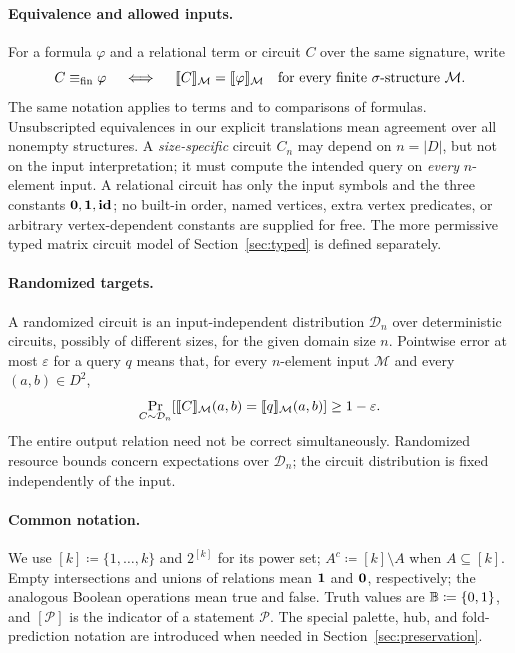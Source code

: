 \paragraph{Equivalence and allowed inputs.}
For a formula $\varphi$ and a relational term or circuit $C$ over
the same signature, write
\[
 C\equiv_{\mathrm{fin}}\varphi
 \quad\iff\quad
 \llbracket C\rrbracket_{\mathcal M}=\llbracket \varphi\rrbracket_{\mathcal M}
 \quad\text{for every finite $\sigma$-structure $\mathcal M$.}
\]
The same notation applies to terms and to comparisons of formulas.
Unsubscripted equivalences in our explicit translations mean
agreement over all nonempty structures. A \emph{size-specific} circuit
$C_n$ may depend on $n=|D|$, but not on the input interpretation;
it must compute the intended query on \emph{every} $n$-element
input. A relational circuit has only the input symbols and the three
constants $\mathbf{0},\mathbf{1},\mathbf{id}$; no built-in order, named vertices,
extra vertex predicates, or arbitrary vertex-dependent constants are
supplied for free. The more permissive typed matrix circuit model of
Section~\ref{sec:typed} is defined separately.

\paragraph{Randomized targets.}
A randomized circuit is an input-independent distribution
$\mathcal D_n$ over deterministic circuits, possibly of different
sizes, for the given domain size $n$. Pointwise error at most
$\varepsilon$ for a query $q$ means that, for every $n$-element input
$\mathcal M$ and every $(a,b)\in D^2$,
\[
 \Pr_{C\sim\mathcal D_n}\!\left[
   \llbracket C\rrbracket_{\mathcal M}(a,b)=\llbracket q\rrbracket_{\mathcal M}(a,b)
 \right]\ge1-\varepsilon.
\]
The entire output relation need not be correct simultaneously.
Randomized resource bounds concern expectations over $\mathcal D_n$;
the circuit distribution is fixed independently of the input.

\paragraph{Common notation.}
We use $[k]\coloneqq\{1,\ldots,k\}$ and $2^{[k]}$ for its power set;
$A^c\coloneqq[k]\setminus A$ when $A\subseteq[k]$. Empty intersections and
unions of relations mean $\mathbf{1}$ and $\mathbf{0}$, respectively; the
analogous Boolean operations mean true and false. Truth values are
$\mathbb B\coloneqq\{0,1\}$, and $[\mathcal P]$ is the indicator of a statement
$\mathcal P$. The special palette, hub, and fold-prediction notation
are introduced when needed in Section~\ref{sec:preservation}.
